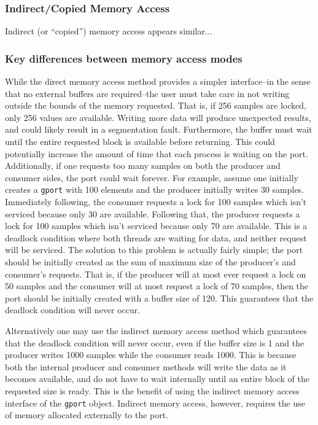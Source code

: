 \subsubsection{Indirect/Copied Memory Access}
Indirect (or ``copied'') memory access appears similar...



\subsubsection{Key differences between memory access modes}
While the direct memory access method provides a simpler interface--in the
sense that no external buffers are required--the user must take care in not
writing outside the bounds of the memory requested.
That is, if 256 samples are locked, only 256 values are available.
Writing more data will produce unexpected results, and could likely result in
a segmentation fault.
Furthermore, the buffer must wait until the entire requested block is
available before returning.
This could potentially increase the amount of time that each process is
waiting on the port.
Additionally, if one requests too many samples on both the producer and
consumer sides, the port could wait forever.
For example, assume one initially creates a {\tt gport} with 100 elements and
the producer initially writes 30 samples.
Immediately following, the consumer requests a lock for 100 samples which
isn't serviced because only 30 are available.
Following that, the producer requests a lock for 100 samples which isn't
serviced because only 70 are available.
This is a deadlock condition where both threads are waiting for data, and
neither request will be serviced.
The solution to this problem is actually fairly simple; the port should be
initially created as the sum of maximum size of the producer's and consumer's
requests.
That is, if the producer will at most ever request a lock on 50 samples and
the consumer will at most request a lock of 70 samples, then the port should
be initially created with a buffer size of 120.
This guarantees that the deadlock condition will never occur.

Alternatively one may use the indirect memory access method which guarantees
that the deadlock condition will never occur, even if the buffer size is 1 and
the producer writes 1000 samples while the consumer reads 1000.
This is because both the internal producer and consumer methods will write
the data as it becomes available, and do not have to wait internally until an
entire block of the requested size is ready.
This is the benefit of using the indirect memory access interface of the
{\tt gport} object.
Indirect memory access, however, requires the use of memory allocated
externally to the port.

